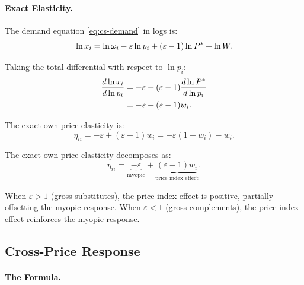 \paragraph{Exact Elasticity.}

The demand equation \eqref{eq:cs-demand} in logs is:
\begin{equation}
\ln x_i = \ln \omega_i - \varepsilon \ln p_i + (\varepsilon - 1) \ln P^{*} + \ln W.
\end{equation}

Taking the total differential with respect to $\ln p_i$:
\begin{align}
\frac{d \ln x_i}{d \ln p_i} &= -\varepsilon + (\varepsilon - 1) \frac{d \ln P^{*}}{d \ln p_i} \notag \\
&= -\varepsilon + (\varepsilon - 1) w_i.
\end{align}

The exact own-price elasticity is:
\begin{equation}
\label{eq:exact-own}
\eta_{ii} = -\varepsilon + (\varepsilon - 1) w_i = -\varepsilon(1 - w_i) - w_i.
\end{equation}

\begin{proposition}
\label{prop:own-price-decomp}
The exact own-price elasticity decomposes as:
\begin{equation}
\eta_{ii} = \underbrace{-\varepsilon}_{\text{myopic}} + \underbrace{(\varepsilon - 1) w_i}_{\text{price index effect}}.
\end{equation}
\end{proposition}

When $\varepsilon > 1$ (gross substitutes), the price index effect is positive, partially offsetting the myopic response. When $\varepsilon < 1$ (gross complements), the price index effect reinforces the myopic response.

\subsection{Cross-Price Response}
\label{subsec:cross-price}

\paragraph{The Formula.}

